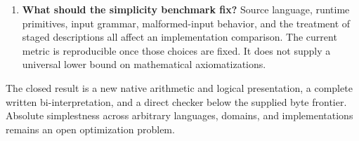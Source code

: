 \begin{enumerate}
\item \textbf{What should the simplicity benchmark fix?} Source language,
runtime primitives, input grammar, malformed-input behavior, and the treatment
of staged descriptions all affect an implementation comparison. The current
metric is reproducible once those choices are fixed. It does not supply a
universal lower bound on mathematical axiomatizations.
\end{enumerate}

The closed result is a new native arithmetic and logical presentation,
a complete written bi-interpretation, and a direct checker below the
supplied byte frontier. Absolute simplestness across arbitrary languages,
domains, and implementations remains an open optimization problem.
